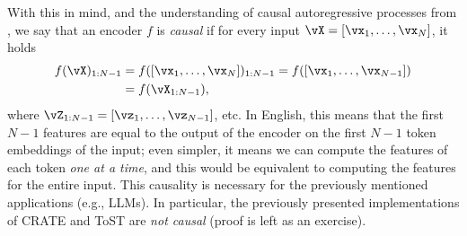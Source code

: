 \documentclass[../../book-main.tex]{subfiles}
\begin{document}
With this in mind, and the understanding of causal autoregressive
processes from , we say that an encoder \(f\) is
\textit{causal} if for every input \(\vX = [\vx_{1}, \dots, \vx_{N}]\), it holds
\begin{align}
    f(\vX)_{1:N-1}
    &= f([\vx_{1}, \dots, \vx_{N}])_{1:N-1} =
    f([\vx_{1}, \dots, \vx_{N - 1}]) \\
    &= f(\vX_{1:N-1}),
\end{align}
where \(\vZ_{1:N-1} = [\vz_{1}, \dots, \vz_{N-1}]\), etc. In English,
this means that the first \(N-1\) features are equal to the output of
the encoder on the first \(N-1\) token embeddings of the input; even
simpler, it means we can compute the features of each token
\textit{one at a time}, and this would be equivalent to computing the
features for the entire input. This causality is necessary for the
previously mentioned applications (e.g., LLMs). In particular, the
previously presented implementations of CRATE and ToST are
\textit{not causal} (proof is left as an exercise).
\end{document}
